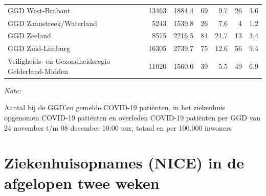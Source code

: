 \documentclass[
  english,
  man,floatsintext]{apa6}
\begin{document}
\begin{table}
\begin{threeparttable}
\begin{tabular}{lrrrrrr}
GGD West-Brabant & 13463 & 1884.4 & 69 & 9.7 & 26 & 3.6\\
GGD Zaanstreek/Waterland & 5243 & 1539.8 & 26 & 7.6 & 4 & 1.2\\
GGD Zeeland & 8575 & 2216.5 & 84 & 21.7 & 13 & 3.4\\
GGD Zuid-Limburg & 16305 & 2739.7 & 75 & 12.6 & 56 & 9.4\\
Veiligheids- en Gezondheidsregio Gelderland-Midden & 11020 & 1560.0 & 39 & 5.5 & 49 & 6.9\\
\bottomrule
\end{tabular}
\begin{tablenotes}
\item \textit{Note: } 
\item Aantal bij de GGD’en gemelde COVID-19 patiënten, in het ziekenhuis opgenomen COVID-19 patiënten en overleden COVID-19 patiënten per GGD van 24 november t/m 08 december 10:00 uur, totaal en per 100.000 inwoners
\end{tablenotes}
\end{threeparttable}
\endgroup{}
\end{table}

\newpage

\hypertarget{ziekenhuisopnames-nice-in-de-afgelopen-twee-weken}{%
\section{Ziekenhuisopnames (NICE) in de afgelopen twee weken}\label{ziekenhuisopnames-nice-in-de-afgelopen-twee-weken}}
\end{document}
